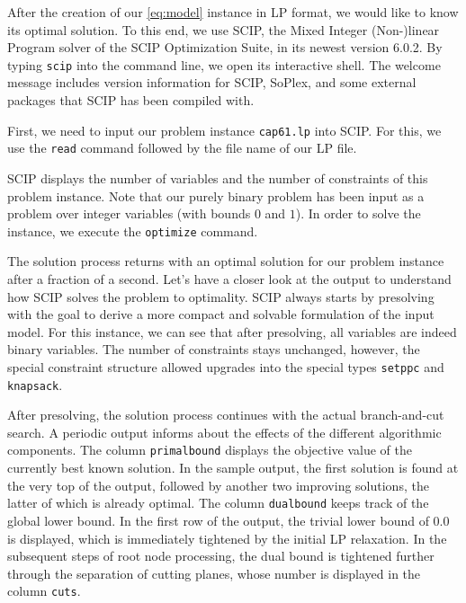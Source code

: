 \documentclass[a4paper,10pt]{article}
\begin{document}
After the creation of our \eqref{eq:model} instance in LP format, we would like to know its optimal solution.
%
To this end, we use SCIP, the Mixed Integer (Non-)linear Program solver of the SCIP Optimization Suite, in its newest version 6.0.2.
%
By typing \texttt{scip} into the command line, we open its interactive shell.
%
The welcome message includes version information for SCIP, SoPlex, and some external packages that SCIP has been compiled with.
%




First, we need to input our problem instance \texttt{cap61.lp} into SCIP.
%
For this, we use the \texttt{read} command followed by the file name of our LP file.




SCIP displays the number of variables and the number of constraints of this problem instance.
%
Note that our purely binary problem has been input as a problem over integer variables (with bounds $0$ and $1$).
%
In order to solve the instance, we execute the \texttt{optimize} command.



The solution process returns with an optimal solution for our problem instance after a fraction of a second.
%
Let's have a closer look at the output to understand how SCIP solves the problem to optimality.
%
SCIP always starts by presolving with the goal to derive a more compact and solvable
formulation of the input model.
%
For this instance, we can see that after presolving, all variables are indeed binary variables.
%
The number of constraints stays unchanged, however, the special
constraint structure allowed upgrades into the special types \texttt{setppc} and \texttt{knapsack}.

After presolving, the solution process continues with the actual branch-and-cut search.
%
A periodic output informs about the effects of the different algorithmic components.
%
The column \texttt{primalbound} displays the objective value of the currently best known solution.
%
In the sample output, the first solution is found at the very top of the output, followed by
another two improving solutions, the latter of which is already optimal.
%
The column \texttt{dualbound} keeps track of the global lower bound.
%
In the first row of the output, the trivial lower bound of 0.0 is displayed, which is immediately tightened
by the initial LP relaxation.
%
In the subsequent steps of root node processing, the dual bound is tightened further through the separation
of cutting planes, whose number is displayed in the column \texttt{cuts}.
\end{document}

